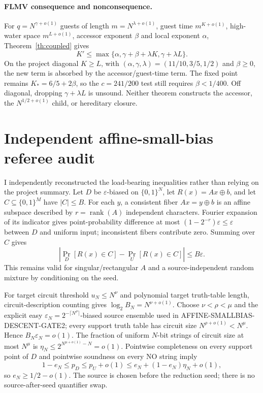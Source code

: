 \documentclass[11pt]{article}
\begin{document}
\paragraph{FLMV consequence and nonconsequence.}
For $q=N^{\gamma+o(1)}$ guests of length $m=N^{\lambda+o(1)}$, guest time
$m^{K+o(1)}$, high-water space $m^{L+o(1)}$, accessor exponent $\beta$ and local
exponent $\alpha$, Theorem~\ref{th:coupled} gives
\[
 K'\le\max\{\alpha,\gamma+\beta+\lambda K,\gamma+\lambda L\}.          \tag{7}
\]
On the project diagonal $K\ge L$, with
$(\alpha,\gamma,\lambda)=(11/10,3/5,1/2)$ and $\beta\ge0$, the new term is
absorbed by the accessor/guest-time term.  The fixed point remains
$K_*=6/5+2\beta$, so the $c=241/200$ test still requires $\beta<1/400$.
Off diagonal, dropping $\gamma+\lambda L$ is unsound.  Neither theorem constructs
the accessor, the $N^{1/2+o(1)}$ child, or hereditary closure.

\section{Independent affine-small-bias referee audit}
I independently reconstructed the load-bearing inequalities rather than relying
on the project summary.  Let $D$ be $\varepsilon$-biased on $\{0,1\}^N$, let
$R(x)=Ax\oplus b$, and let $C\subseteq\{0,1\}^M$ have $|C|\le B$.  For each
$y$, a consistent fiber $Ax=y\oplus b$ is an affine subspace described by
$r=\operatorname{rank}(A)$ independent characters.  Fourier expansion of its
indicator gives point-probability difference at most
$(1-2^{-r})\varepsilon\le\varepsilon$ between $D$ and uniform input; inconsistent
fibers contribute zero.  Summing over $C$ gives
\[
 \left|\Pr_D[R(x)\in C]-\Pr_U[R(x)\in C]\right|\le B\varepsilon.       \tag{4}
\]
This remains valid for singular/rectangular $A$ and a source-independent random
mixture by conditioning on the seed.

For target circuit threshold $u_N\le N^\nu$ and polynomial target truth-table
length, circuit-description counting gives
$\log_2 B_N=N^{\nu+o(1)}$.  Choose $\nu<\rho<\mu$ and the explicit easy
$\varepsilon_N=2^{-\lceil N^\rho\rceil}$-biased source ensemble used in
AFFINE-SMALLBIAS-DESCENT-GATE2; every support truth table has circuit size
$N^{\rho+o(1)}<N^\mu$.  Hence $B_N\varepsilon_N=o(1)$.  The fraction of uniform
$N$-bit strings of circuit size at most $N^\mu$ is
$\eta_N\le2^{N^{\mu+o(1)}-N}=o(1)$.  Pointwise completeness on every support
point of $D$ and pointwise soundness on every NO string imply
\[
 1-e_N\le p_D\le p_U+o(1)
 \le e_N+(1-e_N)\eta_N+o(1),
\]
so $e_N\ge1/2-o(1)$.  The source is chosen before the reduction seed; there is
no source-after-seed quantifier swap.
\end{document}
